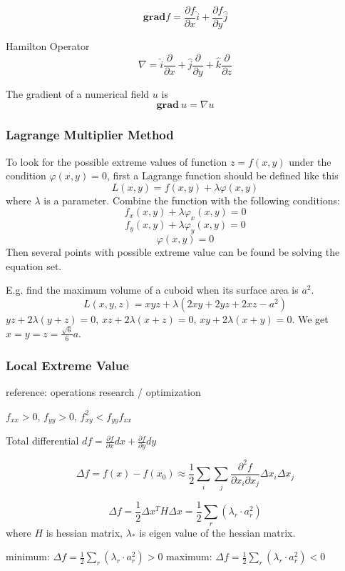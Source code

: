 $$ \mathbf{grad} f = \frac{\partial f}{\partial x} \hat{i} +
 \frac{\partial f}{\partial y} \hat{j} $$

Hamilton Operator
$$ \nabla = \hat{i} \frac{\partial}{\partial x} + \hat{j}\frac{\partial}{\partial y}
		   + \hat{k} \frac{\partial}{\partial z} $$

The gradient of a numerical field $u$ is
$$ \mathbf{grad}~ u = \nabla u $$

 \subsubsection{Lagrange Multiplier Method}

To look for the possible extreme values of function $z=f(x,y)$ under
the condition $\varphi(x,y)=0$, first a Lagrange function should be
defined like this
$$ L(x,y) = f(x,y) + \lambda \varphi(x,y) $$
where $\lambda$ is a parameter. Combine the function with the following
conditions:
$$ f_x(x,y) +\lambda \varphi_x(x,y) = 0 $$
$$ f_y(x,y) +\lambda \varphi_y(x,y) = 0 $$
$$ \varphi(x,y) = 0 $$
Then several points with possible extreme value can be found be solving
the equation set.

E.g. find the maximum volume of a cuboid when its surface area is $a^2$.
$$ L(x,y,z) = xyz + \lambda(2xy + 2yz + 2xz - a^2)$$
$ yz+2\lambda(y+z) = 0$,
$ xz+2\lambda(x+z) = 0$,
$ xy+2\lambda(x+y) = 0$.
We get $x=y=z=\frac{\sqrt{6}}{6} a $.

 \subsubsection{Local Extreme Value}

 reference: operations research / optimization

 $f_{xx} > 0$, $f_{yy} > 0$, $f^2_{xy} < f_{yy}f_{xx}$

 Total differential $df = \frac{\partial f}{\partial x} dx + \frac{\partial f}{\partial y} dy$

 $$\Delta f = f(x) - f(x_0) \approx \frac{1}{2} \sum_i \sum_j \frac{\partial^2 f}{\partial x_i \partial x_j}
   \Delta x_i \Delta x_j$$

 $$\Delta f = \frac{1}{2} \Delta x^T H \Delta x = \frac{1}{2} \sum_r (\lambda_r \cdot a_r^2)$$
 where $H$ is hessian matrix, $\lambda_\ast$ is eigen value of the hessian matrix.

 minimum: $\Delta f = \frac{1}{2} \sum_r (\lambda_r \cdot a_r^2) > 0$
 maximum: $\Delta f = \frac{1}{2} \sum_r (\lambda_r \cdot a_r^2) < 0$

